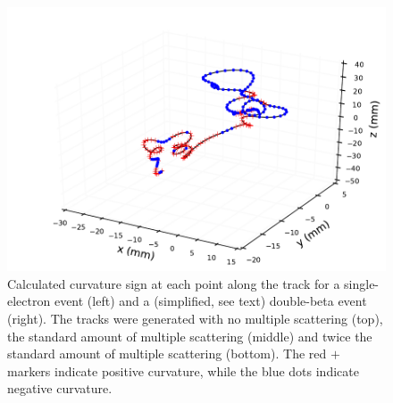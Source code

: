 \documentclass{JINST}
\begin{document}
\begin{figure}[!htb]
	\includegraphics[scale=0.48]{fig/plt_trkcurv_magbb05_ms27pt2_2.pdf}
	\caption{\label{fig_trkcurv_cf}Calculated curvature sign at each point along the track for a single-electron event (left) and a (simplified, see text) double-beta event (right).  The tracks were generated with no multiple scattering (top), the 
	standard amount of multiple scattering (middle) and twice the standard amount of multiple scattering 
	(bottom).  The red $+$ markers indicate positive curvature, while the blue dots indicate negative curvature.}
\end{figure}
\end{document}
